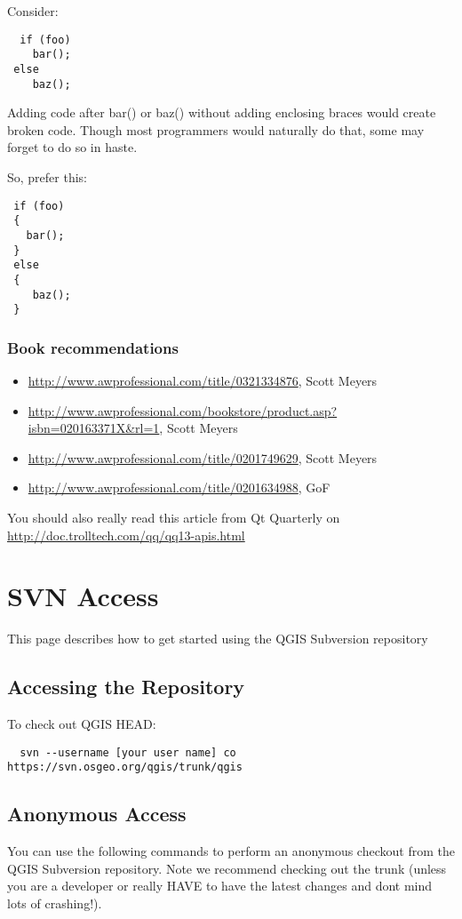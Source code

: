 Consider:

\begin{verbatim}
  if (foo)
    bar();
 else
    baz();
\end{verbatim}

Adding code after bar() or baz() without adding enclosing braces would create
broken code.  Though most programmers would naturally do that, some may forget
to do so in haste.

So, prefer this:

\begin{verbatim}
 if (foo)
 {
   bar();
 }
 else
 { 
    baz();
 } 
\end{verbatim}

\subsubsection{Book recommendations}
\begin{itemize}
\item \url{http://www.awprofessional.com/title/0321334876}, Scott Meyers
\item \url{http://www.awprofessional.com/bookstore/product.asp?isbn=020163371X&rl=1}, Scott Meyers
\item \url{http://www.awprofessional.com/title/0201749629}, Scott Meyers
\item \url{http://www.awprofessional.com/title/0201634988}, GoF
\end{itemize}


You should also really read this article from Qt Quarterly on 
\url{http://doc.trolltech.com/qq/qq13-apis.html}


\section{SVN Access}
This page describes how to get started using the QGIS Subversion repository

\subsection{Accessing the Repository}
To check out QGIS HEAD:

\begin{verbatim}
  svn --username [your user name] co https://svn.osgeo.org/qgis/trunk/qgis
\end{verbatim}

\subsection{Anonymous Access}
You can use the following commands to perform an anonymous checkout from the
QGIS Subversion repository.  Note we recommend checking out the trunk (unless
you are a developer or really HAVE to have the latest changes and dont mind
lots of crashing!).


